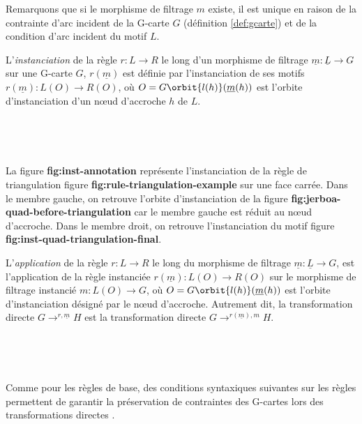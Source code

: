 Remarquons que si le morphisme de filtrage $m$ existe, il est unique en raison de la contrainte d'arc incident de la G-carte $G$ (définition \ref{def:gcarte}) et de la condition d'arc incident du motif $L$.


L'\emph{instanciation} de la règle $r: L \longrightarrow R$ le long d'un morphisme de filtrage $\underline{m} : \underline{L} \rightarrow G$ sur une G-carte $G$, $r(\underline{m})$ est définie par l'instanciation de ses motifs $r(\underline{m}) : L(O) \longrightarrow R(O)$, où $O = G\orbit{l(h)}(\underline{m}(h))$ est l'orbite d'instanciation d'un nœud d'accroche $h$ de $L$.

~



~

La figure \textbf{fig:inst-annotation} représente l'instanciation de la règle de triangulation figure \textbf{fig:rule-triangulation-example} sur une face carrée. Dans le membre gauche, on retrouve l'orbite d'instanciation de la figure \textbf{fig:jerboa-quad-before-triangulation} car le membre gauche est réduit au nœud d'accroche.
Dans le membre droit, on retrouve l'instanciation du motif figure \textbf{fig:inst-quad-triangulation-final}.

L'\emph{application} de la règle $r: L \longrightarrow R$ le long du morphisme de filtrage $\underline{m} : \underline{L} \rightarrow G$, est l'application de la règle instanciée $r(\underline{m}) : L(O) \longrightarrow R(O)$ sur le morphisme de filtrage instancié $m : L(O) \rightarrow G$, où $O = G\orbit{l(h)}(\underline{m}(h))$ est l'orbite d'instanciation désigné par le nœud d'accroche.
Autrement dit, la transformation directe $G \longrightarrow^{r, \underline{m}} H$ est la transformation directe $G \longrightarrow^{r(\underline{m}), m} H$.

~


~

Comme pour les règles de base, des conditions syntaxiques suivantes sur les règles permettent de garantir la préservation de contraintes des G-cartes lors des transformations directes \cite{belle2012}.

